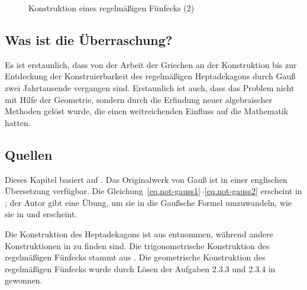 \begin{figure}[t]
\begin{center}
\end{center}
\caption{Konstruktion eines regelmäßigen Fünfecks (2)}\label{f.hept-pentagon3}
\end{figure}

\subsection*{Was ist die Überraschung?}

Es ist erstaunlich, dass von der Arbeit der Griechen an der Konstruktion bis zur Entdeckung der Konstruierbarkeit des regelmäßigen Heptadekagons durch Gauß zwei Jahrtausende vergangen sind. Erstaunlich ist auch, dass das Problem nicht mit Hilfe der Geometrie, sondern durch die Erfindung neuer algebraischer Methoden gelöst wurde, die einen weitreichenden Einfluss auf die Mathematik hatten.


\subsection*{Quellen}

Dieses Kapitel basiert auf \cite{jorg}. Das Originalwerk von Gauß ist in einer englischen Übersetzung \cite{gauss} verfügbar.
Die Gleichung~\ref{eq.not-gauss1}--\ref{eq.not-gauss2} erscheint in \cite{rike}; der Autor gibt eine Übung, um sie in die Gaußsche Formel umzuwandeln, wie sie in \cite[S.~458]{gauss} und \cite[S.~68]{jorg} erscheint.

Die Konstruktion des Heptadekagons ist aus \cite{callagy} entnommen, während andere Konstruktionen in \cite{wiki:heptadecagon} zu finden sind. Die trigonometrische Konstruktion des regelmäßigen Fünfecks stammt aus \cite{wiki:pentagon}. Die geometrische Konstruktion des regelmäßigen Fünfecks wurde durch Lösen der Aufgaben 2.3.3 und 2.3.4 in \cite{stillwell} gewonnen.
